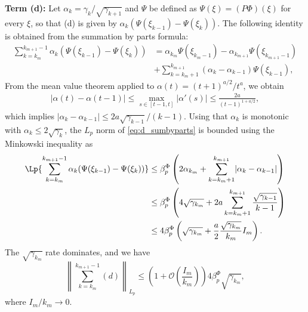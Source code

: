 \documentclass[11pt]{article}
\begin{document}
\textbf{Term (d):}
Let $\alpha_k = \gamma_k/\sqrt{\gamma_{k+1}}$ and $\Psi$ be defined as $\Psi (\xi) = (P \Phi)(\xi)$ for every $\xi$, so that (d) is given by $\alpha_k (\Psi(\xi_{k-1}) - \Psi(\xi_k)) $.
The following identity is obtained from the summation by parts formula:
\begin{equation}\label{eq:d_sumbyparts}
\begin{split}
    \sum_{k=k_m}^{k_{m+1} - 1} \alpha_k (\Psi(\xi_{k-1}) - \Psi(\xi_{k}))
    & =  
    \alpha_{k_m} \Psi(\xi_{k_m - 1})
    - \alpha_{k_{m+1}} \Psi(\xi_{k_{m+1} - 1}) 
    \\ &+ \sum_{k=k_m + 1}^{k_{m+1}}(\alpha_k - \alpha_{k-1}) \Psi(\xi_{k-1}) ,    
\end{split}    
\end{equation}
From the mean value theorem applied to $\alpha(t) = (t+1)^{a/2}/t^a$, we obtain
\begin{align*}
    \left\lvert \alpha(t) - \alpha(t-1) \right\rvert 
    \leq 
    \max_{s \in [t-1, t]} \lvert \alpha'(s) \rvert 
    \leq 
    \frac{2a}{(t-1)^{1 + a/2}} , 
\end{align*}
which implies $\lvert \alpha_k - \alpha_{k-1} \rvert \leq 2a \sqrt{\gamma_{k-1}}/(k-1)$. 
Using that $\alpha_k$ is monotonic with $\alpha_k \leq 2\sqrt{\gamma_k}$, the $L_p$ norm of \eqref{eq:d_sumbyparts} is bounded using the Minkowski inequality as
\begin{align*}
    \Lp{\sum_{k=k_m}^{k_{m+1} - 1} \alpha_k (\Psi(\xi_{k-1}) - \Psi(\xi_{k}))}
    &\leq \beta_p^\Phi \left(2\alpha_{k_m}
    + \sum_{k=k_m+1}^{k_{m+1}} \lvert \alpha_k - \alpha_{k-1} \rvert 
    \right)
    \\ &
    \leq 
    \beta_p^\Phi \left(4 \sqrt{\gamma_{k_m}}
    + 2a \sum_{k=k_m+1}^{k_{m+1}} \frac{\sqrt{\gamma_{k-1}}}{k-1}
    \right)
    \\ &
    \leq 
    4\beta_p^\Phi \left(\sqrt{\gamma_{k_m}} + \frac{a}{2} \frac{\sqrt{\gamma_{k_m}}}{k_m} I_m \right)
    .
\end{align*}
The $\sqrt{\gamma_{k_m}}$ rate dominates, and we have
\begin{equation}\label{eq:dbound}
    \left\lVert \sum_{k=k_m}^{k_{m+1} - 1} (d) \right\rVert_{L_p} 
    \leq \left(1 + \mathcal{O}\left( \frac{I_m}{k_m}\right) \right) 4 \beta_p^\Phi \sqrt{\gamma_{k_m}}  , 
\end{equation}
where $I_m/k_m \to 0$. 
\end{document}
